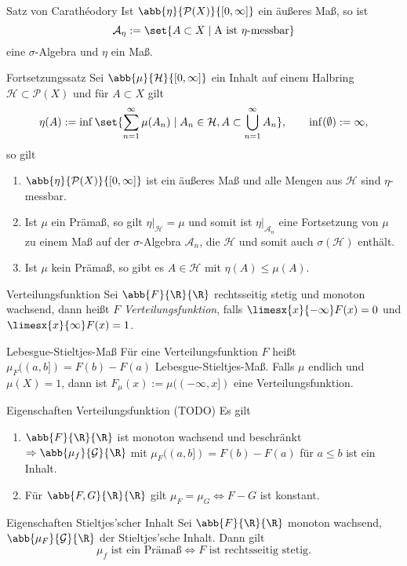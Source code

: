 \begin{karte}{Satz von Carathéodory}
	Ist \( \abb{\eta}{\mathcal{P}(X)}{[0,\infty]} \) ein äußeres Maß, so ist 
	\[ \mathcal{A}_\eta := \set{ A\subset X \;|\; \text{A ist \(\eta\)-messbar} } \]
	eine \(\sigma\)-Algebra und \(\eta\) ein Maß.
\end{karte}

\begin{karte}{Fortsetzungssatz}
	Sei \( \abb{\mu}{\mathcal{H}}{[0,\infty]} \) ein Inhalt auf einem 
	Halbring \( \mathcal{H} \subset \mathcal{P}(X) \) und für \( A \subset X \) 
	gilt 
	\[ \eta(A) := \inf \set{ \sum_{n=1}^\infty \mu(A_n) \;|\; A_n \in \mathcal{H}, A \subset \bigcup_{n=1}^\infty A_n }, 
	\qquad \inf(\emptyset) := \infty, \]
	so gilt 
	\begin{enumerate}
		\item \( \abb{\eta}{\mathcal{P}(X)}{[0,\infty]} \) ist ein äußeres Maß 
		und alle Mengen aus \( \mathcal{H} \) sind \(\eta\)-messbar.
		\item Ist \(\mu\) ein Prämaß, so gilt \( \eta|_{\mathcal{H}} = \mu \) 
		und somit ist \( \eta|_{\mathcal{A}_n} \) eine Fortsetzung von \(\mu\) 
		zu einem Maß auf der \( \sigma \)-Algebra \( \mathcal{A}_n \), die 
		\( \mathcal{H} \) und somit auch \( \sigma(\mathcal{H}) \) enthält.
		\item Ist \(\mu\) kein Prämaß, so gibt es \( A\in \mathcal{H} \) 
		mit \( \eta(A) \leq \mu(A)\).
	\end{enumerate}
\end{karte}


\begin{karte}{Verteilungsfunktion}
	Sei \( \abb{F}{\R}{\R} \) rechtsseitig stetig und monoton wachsend, dann 
	heißt \(F\) \textit{Verteilungsfunktion}, falls \( \limesx{x}{-\infty}F(x) = 0 \) 
	und \( \limesx{x}{\infty}F(x) = 1 \).
\end{karte}

\begin{karte}{Lebesgue-Stieltjes-Maß}
	Für eine Verteilungsfunktion \(F\) heißt \( \mu_F((a,b]) = F(b) - F(a) \) Lebesgue-Stieltjes-Maß. 
	Falls \(\mu\) endlich und \(\mu(X) = 1\), dann ist
	\( F_\mu(x) := \mu((-\infty,x]) \) eine Verteilungsfunktion.
\end{karte}

\begin{karte}{Eigenschaften Verteilungsfunktion (TODO)}
	Es gilt 
	\begin{enumerate}
		\item \( \abb{F}{\R}{\R} \) ist monoton wachsend und beschränkt 
		\( \Rightarrow \abb{\mu_f}{\mathcal{G}}{\R} \) mit 
		\( \mu_F((a,b]) = F(b) - F(a) \) für \(a\leq b\) ist ein Inhalt.
		\item Für \( \abb{F,G}{\R}{\R} \) gilt \( \mu_F = \mu_G \Leftrightarrow F - G\) ist konstant.
	\end{enumerate}
\end{karte}

\begin{karte}{Eigenschaften Stieltjes'scher Inhalt}
	Sei \( \abb{F}{\R}{\R} \) monoton wachsend, \( \abb{\mu_F}{\mathcal{G}}{\R} \) der Stieltjes'sche Inhalt. Dann gilt 
	\[ \mu_f \text{ ist ein Prämaß} \Leftrightarrow F \text{ ist rechtsseitig stetig.} \]
\end{karte}


